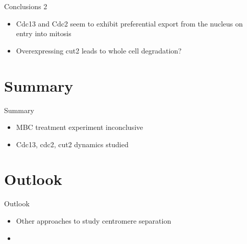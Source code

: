 \begin{frame}{Conclusions 2}
\begin{itemize}
\item Cdc13 and Cdc2 seem to exhibit preferential export from the nucleus on entry into mitosis
\item Overexpressing cut2 leads to whole cell degradation?
\end{itemize}
\end{frame}

\section{Summary}

\begin{frame}{Summary}
\begin{itemize}
	\item MBC treatment experiment inconclusive
	\item Cdc13, cdc2, cut2 dynamics studied
\end{itemize}
\end{frame}

\section{Outlook}
\begin{frame}{Outlook}
\begin{itemize}
	\item Other approaches to study centromere separation
	\item 

\end{itemize}
\end{frame}
 

